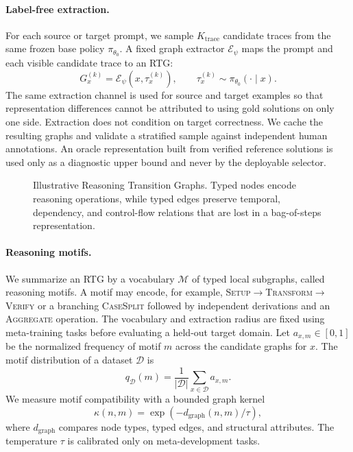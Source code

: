 \paragraph{Label-free extraction.}
For each source or target prompt, we sample $K_{\mathrm{trace}}$ candidate traces
from the same frozen base policy $\pi_{\theta_0}$.  A fixed graph extractor
$\mathcal{E}_{\psi}$ maps the prompt and each visible candidate trace to an RTG:
\begin{equation}
    G_x^{(k)} = \mathcal{E}_{\psi}\!\left(x,\tau_x^{(k)}\right),
    \qquad \tau_x^{(k)}\sim\pi_{\theta_0}(\cdot\mid x).
\end{equation}
The same extraction channel is used for source and target examples so that
representation differences cannot be attributed to using gold solutions on
only one side.  Extraction does not condition on target correctness.  We cache
the resulting graphs and validate a stratified sample against independent
human annotations.  An oracle representation built from verified reference
solutions is used only as a diagnostic upper bound and never by the deployable
selector.

\begin{figure}[t]
    \centering
    \caption{Illustrative Reasoning Transition Graphs.  Typed nodes encode
    reasoning operations, while typed edges preserve temporal, dependency, and
    control-flow relations that are lost in a bag-of-steps representation.}
    \label{fig:rtg}
\end{figure}

\paragraph{Reasoning motifs.}
We summarize an RTG by a vocabulary $\mathcal{M}$ of typed local subgraphs,
called reasoning motifs.  A motif may encode, for example,
\textsc{Setup}$\rightarrow$\textsc{Transform}$\rightarrow$\textsc{Verify} or a
branching \textsc{CaseSplit} followed by independent derivations and an
\textsc{Aggregate} operation.  The vocabulary and extraction radius are fixed
using meta-training tasks before evaluating a held-out target domain.  Let
$a_{x,m}\in[0,1]$ be the normalized frequency of motif $m$ across the candidate
graphs for $x$.  The motif distribution of a dataset $\mathcal{D}$ is
\begin{equation}
    q_{\mathcal{D}}(m)
    = \frac{1}{|\mathcal{D}|}\sum_{x\in\mathcal{D}} a_{x,m}.
\end{equation}
We measure motif compatibility with a bounded graph kernel
\begin{equation}
    \kappa(n,m)=\exp\!\left(-d_{\mathrm{graph}}(n,m)/\tau\right),
\end{equation}
where $d_{\mathrm{graph}}$ compares node types, typed edges, and structural
attributes.  The temperature $\tau$ is calibrated only on meta-development
tasks.

